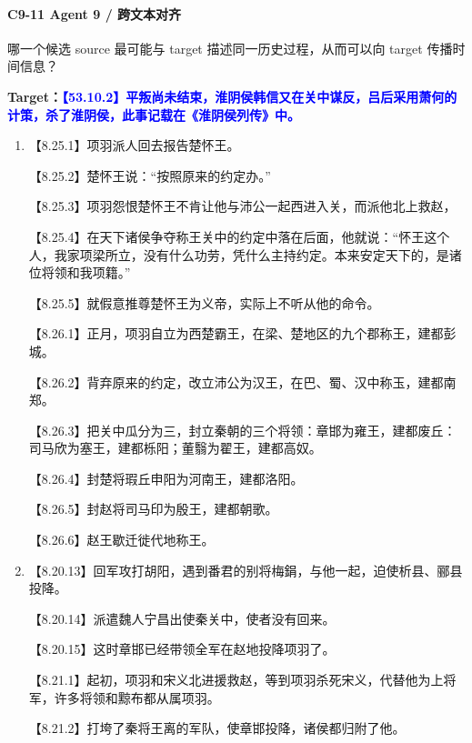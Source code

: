 \documentclass[fontset=none,11pt,a4paper]{ctexart}
\begin{document}
\paragraph{C9-11 \quad Agent 9 / 跨文本对齐}
哪一个候选 source 最可能与 target 描述同一历史过程，从而可以向 target 传播时间信息？

\textbf{Target：}\textcolor{blue}{\textbf{【53.10.2】平叛尚未结束，淮阴侯韩信又在关中谋反，吕后采用萧何的计策，杀了淮阴侯，此事记载在《淮阴侯列传》中。}}

\begin{enumerate}[label=\Alph*.]
  \item
\noindent 【8.25.1】项羽派人回去报告楚怀王。\par
\noindent 【8.25.2】楚怀王说：“按照原来的约定办。”\par
\noindent 【8.25.3】项羽怨恨楚怀王不肯让他与沛公一起西进入关，而派他北上救赵，\par
\noindent 【8.25.4】在天下诸侯争夺称王关中的约定中落在后面，他就说：“怀王这个人，我家项梁所立，没有什么功劳，凭什么主持约定。本来安定天下的，是诸位将领和我项籍。”\par
\noindent 【8.25.5】就假意推尊楚怀王为义帝，实际上不听从他的命令。\par
\noindent 【8.26.1】正月，项羽自立为西楚霸王，在梁、楚地区的九个郡称王，建都彭城。\par
\noindent 【8.26.2】背弃原来的约定，改立沛公为汉王，在巴、蜀、汉中称玉，建都南郑。\par
\noindent 【8.26.3】把关中瓜分为三，封立秦朝的三个将领：章邯为雍王，建都废丘：司马欣为塞王，建都栎阳；董翳为翟王，建都高奴。\par
\noindent 【8.26.4】封楚将瑕丘申阳为河南王，建都洛阳。\par
\noindent 【8.26.5】封赵将司马印为殷王，建都朝歌。\par
\noindent 【8.26.6】赵王歇迁徙代地称王。\par
  \item
\noindent 【8.20.13】回军攻打胡阳，遇到番君的别将梅鋗，与他一起，迫使析县、郦县投降。\par
\noindent 【8.20.14】派遣魏人宁昌出使秦关中，使者没有回来。\par
\noindent 【8.20.15】这时章邯已经带领全军在赵地投降项羽了。\par
\noindent 【8.21.1】起初，项羽和宋义北进援救赵，等到项羽杀死宋义，代替他为上将军，许多将领和黥布都从属项羽。\par
\noindent 【8.21.2】打垮了秦将王离的军队，使章邯投降，诸侯都归附了他。\par

\end{enumerate}
\end{document}
